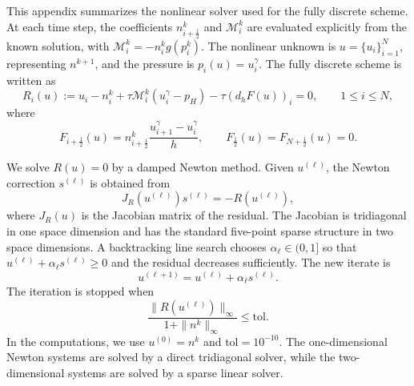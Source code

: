 \documentclass[11pt]{article}
\theoremstyle{plain}
\numberwithin{equation}{section}
\begin{document}
This appendix summarizes the nonlinear solver used for the fully discrete
scheme. At each time step, the coefficients \(n^k_{i+\frac12}\) and
\(\mathcal M_i^k\) are evaluated explicitly from the known solution, with
\(\mathcal M_i^k=-n_i^kg(p_i^k)\). The nonlinear unknown is
\(u=\{u_i\}_{i=1}^N\), representing \(n^{k+1}\), and the pressure is
\(p_i(u)=u_i^\gamma\). The fully discrete scheme is written as
\[
R_i(u):=
u_i-n_i^k+\tau \mathcal M_i^k(u_i^\gamma-p_H)-\tau(d_hF(u))_i=0,
\qquad 1\le i\le N,
\]
where
\[
F_{i+\frac12}(u)
=
n^k_{i+\frac12}\frac{u_{i+1}^\gamma-u_i^\gamma}{h},
\qquad
F_{\frac12}(u)=F_{N+\frac12}(u)=0 .
\]

We solve \(R(u)=0\) by a damped Newton method. Given \(u^{(\ell)}\), the
Newton correction \(s^{(\ell)}\) is obtained from
\[
J_R(u^{(\ell)})s^{(\ell)}=-R(u^{(\ell)}),
\]
where \(J_R(u)\) is the Jacobian matrix of the residual. The Jacobian is
tridiagonal in one space dimension and has the standard five-point sparse
structure in two space dimensions. A backtracking line search chooses
\(\alpha_\ell\in(0,1]\) so that \(u^{(\ell)}+\alpha_\ell s^{(\ell)}\ge0\)
and the residual decreases sufficiently. The new iterate is
\[
u^{(\ell+1)}=u^{(\ell)}+\alpha_\ell s^{(\ell)} .
\]
The iteration is stopped when
\[
\frac{\|R(u^{(\ell)})\|_\infty}{1+\|n^k\|_\infty}
\le \mathrm{tol}.
\]
In the computations, we use \(u^{(0)}=n^k\) and \(\mathrm{tol}=10^{-10}\).
The one-dimensional Newton systems are solved by a direct tridiagonal solver,
while the two-dimensional systems are solved by a sparse linear solver.




\end{document}
